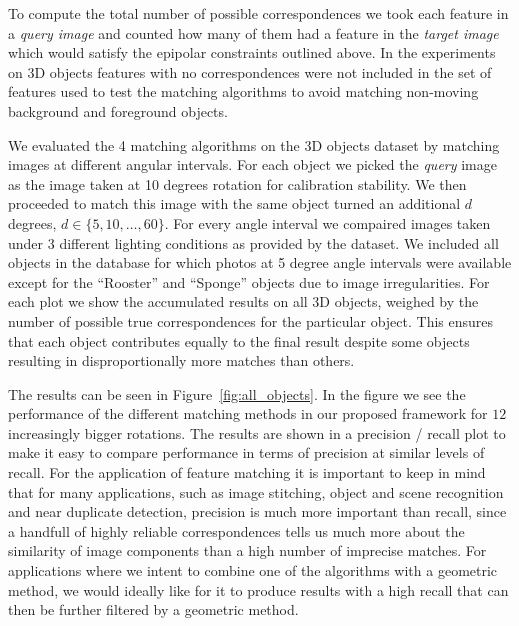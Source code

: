 \documentclass[journal]{IEEEtran}
\begin{document}
To compute the total number of possible correspondences we took each 
feature in a \emph{query image} and counted how many of them had a 
feature in the \emph{target image} which would satisfy the epipolar 
constraints outlined above. In the experiments on 3D objects features 
with no correspondences were not included in the set of features used to 
test the matching algorithms to avoid matching non-moving background and 
foreground objects.

We evaluated the 4 matching algorithms on the 3D objects dataset by 
matching images at different angular intervals. For each object we 
picked the \emph{query} image as the image taken at 10 degrees rotation 
for calibration stability.  We then proceeded to match this image with 
the same object turned an additional $d$ degrees, $d \in \{5, 10, 
\ldots, 60\}$.  For every angle interval we compaired images taken under 
3 different lighting conditions as provided by the dataset.
We included all objects in the database for which photos at 5 degree 
angle intervals were available except for the ``Rooster'' and ``Sponge'' 
objects due to image irregularities. For each plot we show the 
accumulated results on all 3D objects, weighed by the number of possible 
true correspondences for the particular object. This ensures that each 
object contributes equally to the final result despite some objects
resulting in disproportionally more matches than others.

The results can be seen in Figure~\ref{fig:all_objects}. In the figure
we see the performance of the different matching methods in our proposed
framework for $12$ increasingly bigger rotations. The results are shown
in a precision / recall plot to make it easy to compare performance in
terms of precision at similar levels of recall. For the application of
feature matching it is important to keep in mind that for many
applications, such as image stitching, object and scene recognition and
near duplicate detection, precision is much more important than recall,
since a handfull of highly reliable correspondences tells us much more
about the similarity of image components than a high number of imprecise
matches. For applications where we intent to combine one of the
algorithms with a geometric method, we would ideally like for it to
produce results with a high recall that can then be further filtered by
a geometric method.
\end{document}
